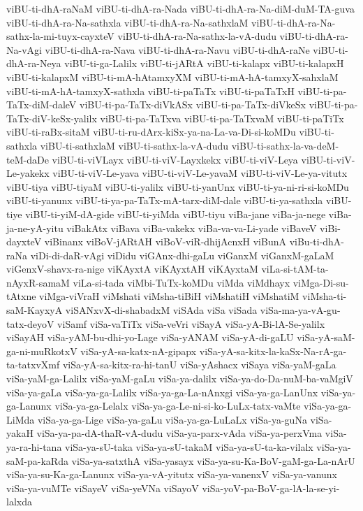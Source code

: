 {viBU-ti-dhA-raNaM
viBU-ti-dhA-ra-Nada
viBU-ti-dhA-ra-Na-diM-duM-TA-guva
viBU-ti-dhA-ra-Na-sathxla
viBU-ti-dhA-ra-Na-sathxlaM
viBU-ti-dhA-ra-Na-sathx-la-mi-tuyx-cayxteV
viBU-ti-dhA-ra-Na-sathx-la-vA-dudu
viBU-ti-dhA-ra-Na-vAgi
viBU-ti-dhA-ra-Nava
viBU-ti-dhA-ra-Navu
viBU-ti-dhA-raNe
viBU-ti-dhA-ra-Neya
viBU-ti-ga-Lalilx
viBU-ti-jARtA
viBU-ti-kalapx
viBU-ti-kalapxH
viBU-ti-kalapxM
viBU-ti-mA-hAtamxyXM
viBU-ti-mA-hA-tamxyX-sahxlaM
viBU-ti-mA-hA-tamxyX-sathxla
viBU-ti-paTaTx
viBU-ti-paTaTxH
viBU-ti-pa-TaTx-diM-daleV
viBU-ti-pa-TaTx-diVkASx
viBU-ti-pa-TaTx-diVkeSx
viBU-ti-pa-TaTx-diV-keSx-yalilx
viBU-ti-pa-TaTxva
viBU-ti-pa-TaTxvaM
viBU-ti-paTiTx
viBU-ti-raBx-sitaM
viBU-ti-ru-dArx-kiSx-ya-na-La-va-Di-si-koMDu
viBU-ti-sathxla
viBU-ti-sathxlaM
viBU-ti-sathx-la-vA-dudu
viBU-ti-sathx-la-va-deM-teM-daDe
viBU-ti-viVLayx
viBU-ti-viV-Layxkekx
viBU-ti-viV-Leya
viBU-ti-viV-Le-yakekx
viBU-ti-viV-Le-yava
viBU-ti-viV-Le-yavaM
viBU-ti-viV-Le-ya-vitutx
viBU-tiya
viBU-tiyaM
viBU-ti-yalilx
viBU-ti-yanUnx
viBU-ti-ya-ni-ri-si-koMDu
viBU-ti-yanunx
viBU-ti-ya-pa-TaTx-mA-tarx-diM-dale
viBU-ti-ya-sathxla
viBU-tiye
viBU-ti-yiM-dA-gide
viBU-ti-yiMda
viBU-tiyu
viBa-jane
viBa-ja-nege
viBa-ja-ne-yA-yitu
viBakAtx
viBava
viBa-vakekx
viBa-va-va-Li-yade
viBaveV
viBi-dayxteV
viBinanx
viBoV-jARtAH
viBoV-viR-dhijAcnxH
viBunA
viBu-ti-dhA-raNa
viDi-di-daR-vAgi
viDidu
viGAnx-dhi-gaLu
viGanxM
viGanxM-gaLaM
viGenxV-shavx-ra-nige
viKAyxtA
viKAyxtAH
viKAyxtaM
viLa-si-tAM-ta-nAyxR-samaM
viLa-si-tada
viMbi-TuTx-koMDu
viMda
viMdhayx
viMga-Di-su-tAtxne
viMga-viVraH
viMshati
viMsha-tiBiH
viMshatiH
viMshatiM
viMsha-ti-saM-KayxyA
viSANxvX-di-shabadxM
viSAda
viSa
viSada
viSa-ma-ya-vA-gu-tatx-deyoV
viSamf
viSa-vaTiTx
viSa-veVri
viSayA
viSa-yA-Bi-lA-Se-yalilx
viSayAH
viSa-yAM-bu-dhi-yo-Lage
viSa-yANAM
viSa-yA-di-gaLU
viSa-yA-saM-ga-ni-muRkotxV
viSa-yA-sa-katx-nA-gipapx
viSa-yA-sa-kitx-la-kaSx-Na-rA-ga-ta-tatxvXmf
viSa-yA-sa-kitx-ra-hi-tanU
viSa-yAshacx
viSaya
viSa-yaM-gaLa
viSa-yaM-ga-Lalilx
viSa-yaM-gaLu
viSa-ya-dalilx
viSa-ya-do-Da-nuM-ba-vaMgiV
viSa-ya-gaLa
viSa-ya-ga-Lalilx
viSa-ya-ga-La-nAnxgi
viSa-ya-ga-LanUnx
viSa-ya-ga-Lanunx
viSa-ya-ga-Lelalx
viSa-ya-ga-Le-ni-si-ko-LuLx-tatx-vaMte
viSa-ya-ga-LiMda
viSa-ya-ga-Lige
viSa-ya-gaLu
viSa-ya-ga-LuLaLx
viSa-ya-guNa
viSa-yakaH
viSa-ya-pa-dA-thaR-vA-dudu
viSa-ya-parx-vAda
viSa-ya-perxVma
viSa-ya-ra-hi-tana
viSa-ya-sU-taka
viSa-ya-sU-takaM
viSa-ya-sU-ta-ka-vilalx
viSa-ya-saM-pa-kaRda
viSa-ya-satxthA
viSa-yasayx
viSa-ya-su-Ka-BoV-gaM-ga-La-nArU
viSa-ya-su-Ka-ga-Lanunx
viSa-ya-vA-yitutx
viSa-ya-vanenxV
viSa-ya-vanunx
viSa-ya-vuMTe
viSayeV
viSa-yeVNa
viSayoV
viSa-yoV-pa-BoV-ga-lA-la-se-yi-lalxda
}
